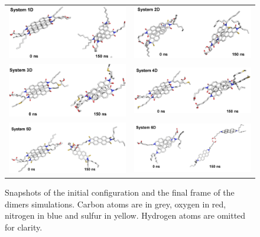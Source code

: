 \begin{figure}[htb]
	\begin{tabular}{cc}
		 \includegraphics[width=0.45\columnwidth]{image/Figure2a}&
		 \includegraphics[width=0.45\columnwidth]{image/Figure2b}\\    
		 \includegraphics[width=0.45\columnwidth]{image/Figure2c}&     
		 \includegraphics[width=0.45\columnwidth]{image/Figure2d}\\     
		 \includegraphics[width=0.45\columnwidth]{image/Figure2e}&
		 \includegraphics[width=0.45\columnwidth]{image/Figure2f}\\
	\end{tabular}
	\caption{Snapshots of the initial configuration and the final frame of the dimers simulations. Carbon atoms are in grey, oxygen in red, nitrogen in blue and sulfur in yellow. Hydrogen atoms are omitted for clarity.}
	\label{pap:fig03}
\end{figure}

